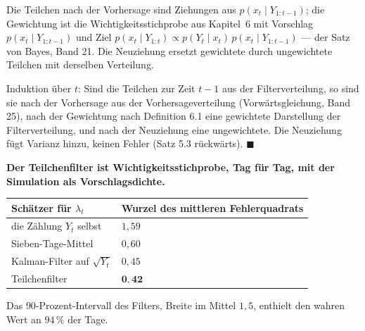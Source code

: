 \begin{merksatz}
Die Teilchen nach der Vorhersage sind Ziehungen aus $p(x_t\mid Y_{1:t-1})$; die Gewichtung ist die Wichtigkeitsstichprobe aus Kapitel~6 mit Vorschlag $p(x_t\mid Y_{1:t-1})$ und Ziel $p(x_t\mid Y_{1:t}) \propto p(Y_t\mid x_t)\,p(x_t\mid Y_{1:t-1})$ --- der Satz von Bayes, Band 21. Die Neuziehung ersetzt gewichtete durch ungewichtete Teilchen mit derselben Verteilung.

Induktion über $t$: Sind die Teilchen zur Zeit $t-1$ aus der Filterverteilung, so sind sie nach der Vorhersage aus der Vorhersageverteilung (Vorwärtsgleichung, Band 25), nach der Gewichtung nach Definition 6.1 eine gewichtete Darstellung der Filterverteilung, und nach der Neuziehung eine ungewichtete. Die Neuziehung fügt Varianz hinzu, keinen Fehler (Satz 5.3 rückwärts). $\blacksquare$

\begin{center}
\begin{minipage}{0.9\textwidth}
\textbf{Der Teilchenfilter ist Wichtigkeitsstichprobe, Tag für Tag, mit der Simulation als Vorschlagsdichte.}
\end{minipage}
\end{center}

\begin{center}
{\small
\renewcommand{\arraystretch}{1.48}
\begin{tabular}{@{}P{4.4cm}P{2.4cm}@{}}
\toprule
\textbf{Schätzer für $\lambda_t$} & \textbf{Wurzel des mittleren Fehlerquadrats}\\
\midrule
die Zählung $Y_t$ selbst & $1{,}59$\\
Sieben-Tage-Mittel & $0{,}60$\\
Kalman-Filter auf $\sqrt{Y_t}$ & $0{,}45$\\
Teilchenfilter & $\mathbf{0{,}42}$\\
\bottomrule
\end{tabular}}
\end{center}
Das $90$-Prozent-Intervall des Filters, Breite im Mittel $1{,}5$, enthielt den wahren Wert an $94\,\%$ der Tage.

\begin{center}
\begin{minipage}{0.88\textwidth}
\end{minipage}
\end{center}
\end{merksatz}


